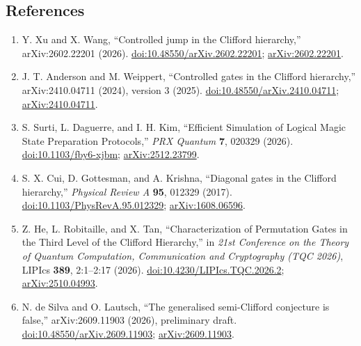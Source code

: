 \subsection*{References}

\begin{enumerate}[label={},leftmargin=4.8em,labelsep=0.5em]
  \footnotesize
  \item[\textup{[XW26]}]\label{ref:e432-xu-wang}
  Y. Xu and X. Wang, ``Controlled jump in the Clifford hierarchy,''
  arXiv:2602.22201 (2026).
  \href{https://doi.org/10.48550/arXiv.2602.22201}{doi:10.48550/arXiv.2602.22201};
  \href{https://arxiv.org/abs/2602.22201}{arXiv:2602.22201}.

  \item[\textup{[AW24]}]\label{ref:e432-anderson-weippert}
  J. T. Anderson and M. Weippert, ``Controlled gates in the Clifford
  hierarchy,'' arXiv:2410.04711 (2024), version 3 (2025).
  \href{https://doi.org/10.48550/arXiv.2410.04711}{doi:10.48550/arXiv.2410.04711};
  \href{https://arxiv.org/abs/2410.04711}{arXiv:2410.04711}.

  \item[\textup{[SDK26]}]\label{ref:e432-surti-daguerre-kim}
  S. Surti, L. Daguerre, and I. H. Kim, ``Efficient Simulation of Logical
  Magic State Preparation Protocols,'' \emph{PRX Quantum} \textbf{7}, 020329
  (2026).
  \href{https://doi.org/10.1103/fby6-xjbm}{doi:10.1103/fby6-xjbm};
  \href{https://arxiv.org/abs/2512.23799}{arXiv:2512.23799}.

  \item[\textup{[CGK17]}]\label{ref:e432-cui-gottesman-krishna}
  S. X. Cui, D. Gottesman, and A. Krishna, ``Diagonal gates in the Clifford
  hierarchy,'' \emph{Physical Review A} \textbf{95}, 012329 (2017).
  \href{https://doi.org/10.1103/PhysRevA.95.012329}{doi:10.1103/PhysRevA.95.012329};
  \href{https://arxiv.org/abs/1608.06596}{arXiv:1608.06596}.

  \item[\textup{[HRT26]}]\label{ref:e432-he-robitaille-tan}
  Z. He, L. Robitaille, and X. Tan, ``Characterization of Permutation Gates
  in the Third Level of the Clifford Hierarchy,'' in \emph{21st Conference on
  the Theory of Quantum Computation, Communication and Cryptography (TQC
  2026)}, LIPIcs \textbf{389}, 2:1--2:17 (2026).
  \href{https://doi.org/10.4230/LIPIcs.TQC.2026.2}{doi:10.4230/LIPIcs.TQC.2026.2};
  \href{https://arxiv.org/abs/2510.04993}{arXiv:2510.04993}.

  \item[\textup{[dSL26]}]\label{ref:e432-de-silva-lautsch}
  N. de Silva and O. Lautsch, ``The generalised semi-Clifford conjecture is
  false,'' arXiv:2609.11903 (2026), preliminary draft.
  \href{https://doi.org/10.48550/arXiv.2609.11903}{doi:10.48550/arXiv.2609.11903};
  \href{https://arxiv.org/abs/2609.11903}{arXiv:2609.11903}.
\end{enumerate}

